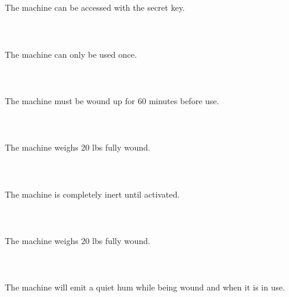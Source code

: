 \documentclass{article}
\begin{document}
    \newpage
    
    \section{}
    The machine can be accessed with the secret key.\\\\ 
    \newpage
    
    \section{}
    The machine can only be used once.\\\\ 
    \newpage
    
    \section{}
    The machine must be wound up for 60 minutes before use.\\\\ 
    \newpage
    
    \section{}
    The machine weighs 20 lbs fully wound.\\\\ 
    \newpage
    
    \section{}
    The machine is completely inert until activated.\\\\ 
    \newpage
    
    \section{}
    The machine weighs 20 lbs fully wound.\\\\ 
    \newpage
    
    \section{}
    The machine will emit a quiet hum while being wound and when it is in use.\\\\ 
    \newpage
    
\end{document}
